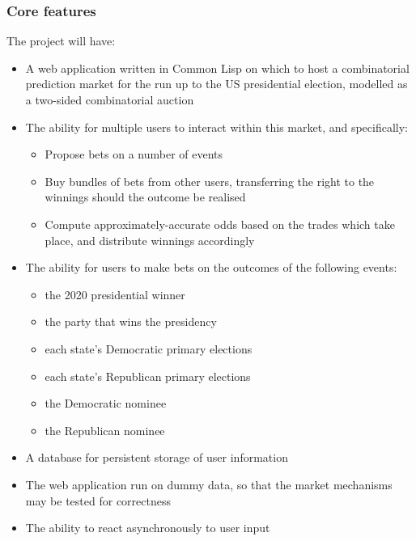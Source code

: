 \documentclass[10pt,a4paper]{article}
\theoremstyle{plain}
\theoremstyle{definition}
\begin{document}
	\subsubsection{Core features}

	The project will have:

	\begin{itemize}
		\itemsep0em
		\item A web application written in Common Lisp on which to host a
			combinatorial prediction market for the run up to the US
			presidential election, modelled as a two-sided combinatorial
			auction

		\item The ability for multiple users to interact within this market,
			and specifically:
			\begin{itemize}
				\itemsep0em
				\item Propose bets on a number of events
				\item Buy bundles of bets from other users, transferring the
					right to the winnings should the outcome be realised
				\item Compute approximately-accurate odds based on the trades
					which take place, and distribute winnings accordingly
			\end{itemize}

		\item The ability for users to make bets on the outcomes of the
			following events:
			\begin{itemize}
				\itemsep0em
				\item the 2020 presidential winner
				\item the party that wins the presidency
				\item each state's Democratic primary elections
				\item each state's Republican primary elections
				\item the Democratic nominee
				\item the Republican nominee
			\end{itemize}

		\item A database for persistent storage of user information

		\item The web application run on dummy data, so that the market
			mechanisms may be tested for correctness

		\item The ability to react asynchronously to user input
	\end{itemize}
\end{document}
